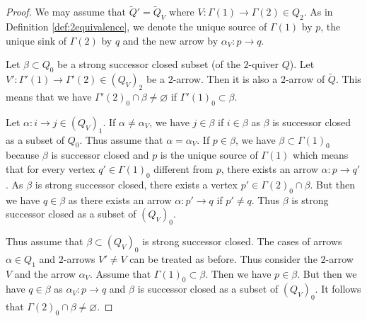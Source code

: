 \documentclass{amsart}
\numberwithin{equation}{section}
\newcommand{\Gr}{\mathrm{Gr}}
\begin{document}
\begin{proof}
We may assume that $\tilde Q'=\tilde Q_V$ where $V:\Gamma(1)\to\Gamma(2)\in Q_2$. As in Definition \ref{def:2equivalence}, we denote the unique source of $\Gamma(1)$ by $p$, the unique sink of $\Gamma(2)$ by $q$ and the new arrow by $\alpha_V:p\to q$.

Let $\beta\subset Q_0$ be a strong successor closed subset (of the $2$-quiver $Q$). Let $V':\Gamma'(1)\to\Gamma'(2)\in (Q_V)_2$ be a  $2$-arrow. Then it is also a $2$-arrow of $\tilde Q$. This means that  we have $\Gamma'(2)_0\cap \beta\neq\varnothing$ if $\Gamma'(1)_0\subset \beta$. 
 
Let $\alpha:i\to j\in (Q_V)_1$. If $\alpha\neq\alpha_V$, we have $j\in \beta$ if $i\in\beta$ as $\beta$ is successor closed as a subset of $Q_0$. Thus assume that $\alpha=\alpha_V$. If $p\in\beta$, we have $\beta\subset\Gamma(1)_0$ because $\beta$ is successor closed and $p$ is the unique source of $\Gamma(1)$ which means that for every vertex $q'\in\Gamma(1)_0$ different from $p$, there exists an arrow $\alpha:p\to q'$. As $\beta$ is strong successor closed, there exists a vertex $p'\in\Gamma(2)_0\cap\beta$. But then we have $q\in\beta$ as there exists an arrow $\alpha:p'\to q$ if $p'\neq q$. Thus $\beta$ is strong successor closed as a subset of $(Q_V)_0$.


Thus assume that $\beta\subset (Q_V)_0$ is strong successor closed. The cases of arrows $\alpha\in Q_1$ and $2$-arrows $V'\neq V$ can be treated as before. Thus consider the $2$-arrow $V$ and the arrow $\alpha_V$. Assume that $\Gamma(1)_0\subset\beta$. Then we have $p\in\beta$. But then we have $q\in\beta$ as $\alpha_V:p\to q$ and $\beta$ is successor closed as a subset of $(Q_V)_0$. It follows that $\Gamma(2)_0\cap\beta\neq\varnothing$.
\end{proof}

\end{document}
